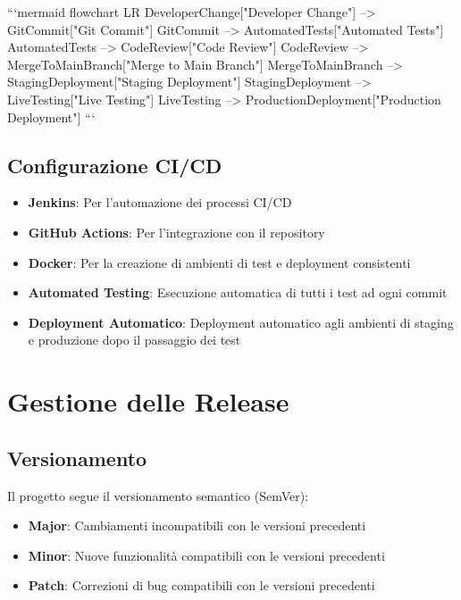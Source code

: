 ```mermaid
flowchart LR
    DeveloperChange["Developer Change"] --> GitCommit["Git Commit"]
    GitCommit --> AutomatedTests["Automated Tests"]
    AutomatedTests --> CodeReview["Code Review"]
    CodeReview --> MergeToMainBranch["Merge to Main Branch"]
    MergeToMainBranch --> StagingDeployment["Staging Deployment"]
    StagingDeployment --> LiveTesting["Live Testing"]
    LiveTesting --> ProductionDeployment["Production Deployment"]
```

\subsection{Configurazione CI/CD}
\begin{itemize}
    \item \textbf{Jenkins}: Per l'automazione dei processi CI/CD
    \item \textbf{GitHub Actions}: Per l'integrazione con il repository
    \item \textbf{Docker}: Per la creazione di ambienti di test e deployment consistenti
    \item \textbf{Automated Testing}: Esecuzione automatica di tutti i test ad ogni commit
    \item \textbf{Deployment Automatico}: Deployment automatico agli ambienti di staging e produzione dopo il passaggio dei test
\end{itemize}

\section{Gestione delle Release}

\subsection{Versionamento}
Il progetto segue il versionamento semantico (SemVer):

\begin{itemize}
    \item \textbf{Major}: Cambiamenti incompatibili con le versioni precedenti
    \item \textbf{Minor}: Nuove funzionalità compatibili con le versioni precedenti
    \item \textbf{Patch}: Correzioni di bug compatibili con le versioni precedenti
\end{itemize}

